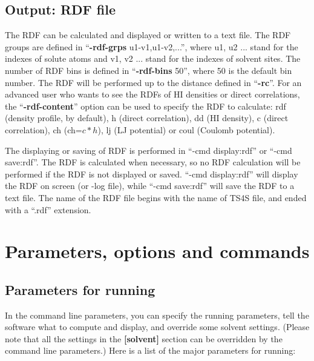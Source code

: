 \documentclass[aip,amsmath,amssymb,reprint,onecolumn]{revtex4-1}
\begin{document}
\subsection{Output: RDF file}\label{sec:io.rdf}

The RDF can be calculated and displayed or written to a text file. The RDF groups are defined in ``{\bf -rdf-grps} u1-v1,u1-v2,...'', where u1, u2 ... stand for the indexes of solute atoms and v1, v2 ... stand for the indexes of solvent sites. The number of RDF bins is defined in ``{\bf -rdf-bins} 50'', where 50 is the default bin number. The RDF will be performed up to the distance defined in ``{\bf -rc}''. For an advanced user who wants to see the RDFs of HI densities or direct correlations, the ``{\bf -rdf-content}'' option can be used to specify the RDF to calculate: rdf (density profile, by default), h (direct correlation), dd (HI density), c (direct correlation), ch (ch=$c*h$), lj (LJ potential) or coul (Coulomb potential).

The displaying or saving of RDF is performed in ``-cmd display:rdf'' or ``-cmd save:rdf''. The RDF is calculated when necessary, so no RDF calculation will be performed if the RDF is not displayed or saved. ``-cmd display:rdf'' will display the RDF on screen (or -log file), while ``-cmd save:rdf'' will save the RDF to a text file. The name of the RDF file begins with the name of TS4S file, and ended with a ``.rdf'' extension.



\section{Parameters, options and commands}\label{sec:param}

\subsection{Parameters for running}\label{sec:param.param}

In the command line parameters, you can specify the running parameters, tell the software what to compute and display, and override some solvent settings. (Please note that all the settings in the {\bf [solvent]} section can be overridden by the command line parameters.) Here is a list of the major parameters for running:
\end{document}
